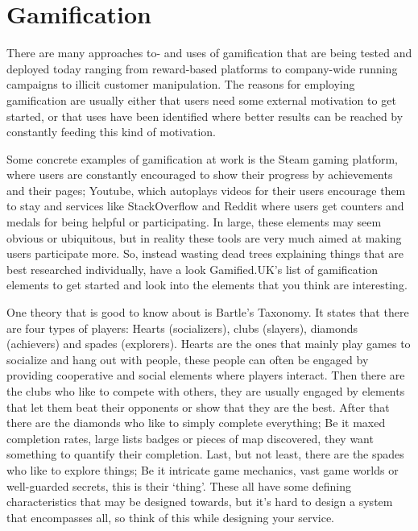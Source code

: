 \section*{Gamification}
\begin{refsection}
There are many approaches to- and uses of gamification that are being tested and deployed today ranging from reward-based platforms to company-wide running campaigns to illicit customer manipulation. The reasons for employing gamification are usually either that users need some external motivation to get started, or that uses have been identified where better results can be reached by constantly feeding this kind of motivation.

    Some concrete examples of gamification at work is the Steam gaming platform, where users are constantly encouraged to show their progress by achievements and their pages; Youtube, which autoplays videos for their users encourage them to stay and services like StackOverflow and Reddit where users get counters and medals for being helpful or participating. In large, these elements may seem obvious or ubiquitous, but in reality these tools are very much aimed at making users participate more. So, instead wasting dead trees explaining things that are best researched individually, have a look Gamified.UK's list of gamification\supercite{gamifieduk} elements to get started and look into the elements that you think are interesting.

    One theory that is good to know about is Bartle's Taxonomy\supercite{bartle}. It states that there are four types of players: Hearts (socializers), clubs (slayers), diamonds (achievers) and spades (explorers). Hearts are the ones that mainly play games to socialize and hang out with people, these people can often be engaged by providing cooperative and social elements where players interact. Then there are the clubs who like to compete with others, they are usually engaged by elements that let them beat their opponents or show that they are the best. After that there are the diamonds who like to simply complete everything; Be it maxed completion rates, large lists badges or pieces of map discovered, they want something to quantify their completion. Last, but not least, there are the spades who like to explore things; Be it intricate game mechanics, vast game worlds or well-guarded secrets, this is their `thing'. These all have some defining characteristics that may be designed towards, but it's hard to design a system that encompasses all, so think of this while designing your service.

\printbibliography[heading=subbibliography]

\end{refsection}

